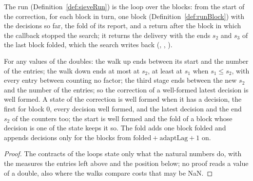The run (Definition~\ref{def:sieveRun}) is the loop over the blocks: from the start of the
correction, for each block in turn, one block (Definition~\ref{def:runBlock}) with the decisions so
far, the fold of its report, and a return after the block in which the callback stopped the search;
it returns the delivery with the ends $s_2$ and $s_3$ of the last block folded, which the search
writes back (, ,
).

\begin{lemma}\label{lem:correctionWF}
  \leanok
  For any values of the doubles: the walk up ends between its start and the number of the entries;
  the walk down ends at most at $s_2$, at least at $s_1$ when $s_1 \le s_2$, with every entry
  between counting no factor; the third stage ends between the new $s_2$ and the number of the
  entries; so the correction of a well-formed latest decision is well formed. A state of the
  correction is well formed when it has a decision, the first for block $0$, every decision well
  formed, and the latest decision and the end $s_2$ of the counters too; the start is well formed
  and the fold of a block whose decision is one of the state keeps it so. The fold adds one block
  folded and appends decisions only for the blocks from $\mathrm{folded} + \mathrm{adaptLag} + 1$
  on.
\end{lemma}

\begin{proof}
  \leanok
  The contracts of the loops state only what the natural numbers do, with the measures the entries
  left above and the position below; no proof reads a value of a double, also where the walks
  compare costs that may be NaN.
\end{proof}

